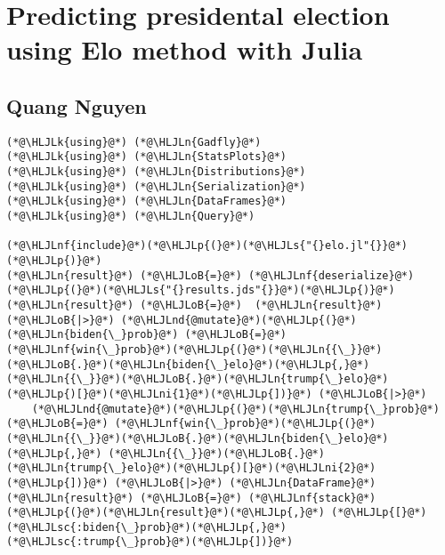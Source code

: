 \documentclass[12pt,a4paper]{article}
\newcommand{\HLJLk}[1]{\textcolor[RGB]{148,91,176}{\textbf{#1}}}
\newcommand{\HLJLn}[1]{#1}
\newcommand{\HLJLnd}[1]{\textcolor[RGB]{214,102,97}{#1}}
\newcommand{\HLJLnf}[1]{\textcolor[RGB]{66,102,213}{#1}}
\newcommand{\HLJLs}[1]{\textcolor[RGB]{201,61,57}{#1}}
\newcommand{\HLJLsc}[1]{\textcolor[RGB]{201,61,57}{#1}}
\newcommand{\HLJLni}[1]{\textcolor[RGB]{59,151,46}{#1}}
\newcommand{\HLJLoB}[1]{\textcolor[RGB]{102,102,102}{\textbf{#1}}}
\newcommand{\HLJLp}[1]{#1}
\begin{document}
\section{Predicting presidental election using Elo method with Julia}
\subsection{Quang Nguyen}

\begin{lstlisting}
(*@\HLJLk{using}@*) (*@\HLJLn{Gadfly}@*)
(*@\HLJLk{using}@*) (*@\HLJLn{StatsPlots}@*)
(*@\HLJLk{using}@*) (*@\HLJLn{Distributions}@*)
(*@\HLJLk{using}@*) (*@\HLJLn{Serialization}@*) 
(*@\HLJLk{using}@*) (*@\HLJLn{DataFrames}@*)
(*@\HLJLk{using}@*) (*@\HLJLn{Query}@*)

(*@\HLJLnf{include}@*)(*@\HLJLp{(}@*)(*@\HLJLs{"{}elo.jl"{}}@*)(*@\HLJLp{)}@*)
(*@\HLJLn{result}@*) (*@\HLJLoB{=}@*) (*@\HLJLnf{deserialize}@*)(*@\HLJLp{(}@*)(*@\HLJLs{"{}results.jds"{}}@*)(*@\HLJLp{)}@*)
(*@\HLJLn{result}@*) (*@\HLJLoB{=}@*)  (*@\HLJLn{result}@*) (*@\HLJLoB{|>}@*) (*@\HLJLnd{@mutate}@*)(*@\HLJLp{(}@*)(*@\HLJLn{biden{\_}prob}@*) (*@\HLJLoB{=}@*) (*@\HLJLnf{win{\_}prob}@*)(*@\HLJLp{(}@*)(*@\HLJLn{{\_}}@*)(*@\HLJLoB{.}@*)(*@\HLJLn{biden{\_}elo}@*)(*@\HLJLp{,}@*) (*@\HLJLn{{\_}}@*)(*@\HLJLoB{.}@*)(*@\HLJLn{trump{\_}elo}@*)(*@\HLJLp{)[}@*)(*@\HLJLni{1}@*)(*@\HLJLp{])}@*) (*@\HLJLoB{|>}@*) 
    (*@\HLJLnd{@mutate}@*)(*@\HLJLp{(}@*)(*@\HLJLn{trump{\_}prob}@*) (*@\HLJLoB{=}@*) (*@\HLJLnf{win{\_}prob}@*)(*@\HLJLp{(}@*)(*@\HLJLn{{\_}}@*)(*@\HLJLoB{.}@*)(*@\HLJLn{biden{\_}elo}@*)(*@\HLJLp{,}@*) (*@\HLJLn{{\_}}@*)(*@\HLJLoB{.}@*)(*@\HLJLn{trump{\_}elo}@*)(*@\HLJLp{)[}@*)(*@\HLJLni{2}@*)(*@\HLJLp{])}@*) (*@\HLJLoB{|>}@*) (*@\HLJLn{DataFrame}@*)
(*@\HLJLn{result}@*) (*@\HLJLoB{=}@*) (*@\HLJLnf{stack}@*)(*@\HLJLp{(}@*)(*@\HLJLn{result}@*)(*@\HLJLp{,}@*) (*@\HLJLp{[}@*)(*@\HLJLsc{:biden{\_}prob}@*)(*@\HLJLp{,}@*) (*@\HLJLsc{:trump{\_}prob}@*)(*@\HLJLp{])}@*)
\end{lstlisting}
\end{document}
